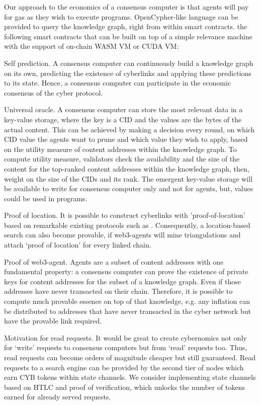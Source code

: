 \documentclass[8pt,oneside]{amsart}
\newcommand{\linkgreen}[2]{\href{#1}{\color{green}{#2}}}
\newcommand{\code}[1]{{\PlayBold #1}}
\begin{document}
Our approach to the economics of a consensus computer is that agents will pay for gas as they wish to execute programs. OpenCypher-like language can be provided to query the knowledge graph, right from within smart contracts. \linkgreen{https://medium.com/@karpathy/software-2-0-a64152b37c35}{We can envision} the following smart contracts that can be built on top of a simple relevance machine with the support of on-chain WASM VM or CUDA VM:

\code{Self prediction}. A consensus computer can continuously build a knowledge graph on its own, predicting the existence of cyberlinks and applying these predictions to its state. Hence, a consensus computer can participate in the economic consensus of the cyber protocol.

\code{Universal oracle}. A consensus computer can store the most relevant data in a key-value storage, where the key is a CID and the values are the bytes of the actual content. This can be achieved by making a decision every round, on which CID value the agents want to prune and which value they wish to apply, based on the utility measure of content addresses within the knowledge graph. To compute utility measure, validators check the availability and the size of the content for the top-ranked content addresses within the knowledge graph, then, weight on the size of the CIDs and its rank. The emergent key-value storage will be available to write for consensus computer only and not for agents, but, values could be used in programs.

\code{Proof of location}. It is possible to construct cyberlinks with 'proof-of-location' based on remarkable existing protocols such as \linkgreen{https://ipfs.io/ipfs/QmZYKGuLHf2h1mZrhiP2FzYsjj3tWt2LYduMCRbpgi5pKG}{Foam}. Consequently, a location-based search can also become provable, if web3-agents will mine triangulations and attach ‘proof of location’ for every linked chain.

\code{Proof of web3-agent}. Agents are a subset of content addresses with one fundamental property: a consensus computer can prove the existence of private keys for content addresses for the subset of a knowledge graph. Even if those addresses have never transacted on their chain. Therefore, it is possible to compute much provable essence on top of that knowledge, e.g. any inflation can be distributed to addresses that have never transacted in the cyber network but have the provable link required.

\code{Motivation for read requests}. It would be great to create cybernomics not only for ‘write’ requests to consensus computers but from ‘read’ requests too. Thus, read requests can become orders of magnitude cheaper but still guaranteed. Read requests to a search engine can be provided by the second tier of nodes which earn CYB tokens within state channels. We consider implementing state channels based on HTLC and proof of verification, which unlocks the number of tokens earned for already served requests.
\end{document}
